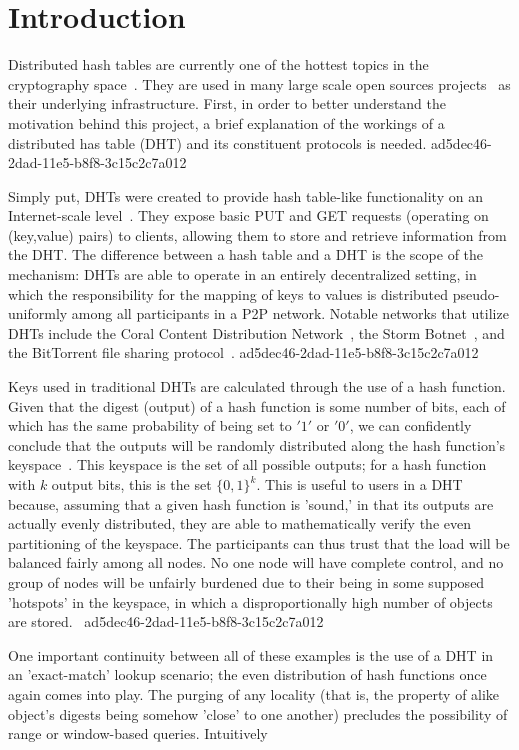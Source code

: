 \documentclass[12pt]{article}
\begin{document}
\section{Introduction}
\par Distributed hash tables are currently one of the hottest topics in the cryptography space~\cite{Stoica:2001dj,Rowstron:2001ea,Ratnasamy:2001wn}. They are used in many large scale open sources projects~\cite{Freitas:2013tb,Xu:2010vs,Perfitt:2010fh} as their underlying infrastructure. First, in order to better understand the motivation behind this project, a brief explanation of the workings of a distributed has table (DHT) and its constituent protocols is needed.
ad5dec46-2dad-11e5-b8f8-3c15c2c7a012
\par Simply put, DHTs were created to provide hash table-like functionality on an Internet-scale level~\cite{Ratnasamy:2001wn}. They expose basic PUT and GET requests (operating on (key,value) pairs) to clients, allowing them to store and retrieve information from the DHT. The difference between a hash table and a DHT is the scope of the mechanism: DHTs are able to operate in an entirely decentralized setting, in which the responsibility for the mapping of keys to values is distributed pseudo-uniformly among all participants in a P2P network. Notable networks that utilize DHTs include the Coral Content Distribution Network~\cite{Freedman:2004vb}, the Storm Botnet~\cite{Holz:2008uk}, and the BitTorrent file sharing protocol~\cite{Cohen:y1_8mBnw}.
ad5dec46-2dad-11e5-b8f8-3c15c2c7a012
\par Keys used in traditional DHTs are calculated through the use of a hash function. Given that the digest (output) of a hash function is some number of bits, each of which has the same probability of being set to $'1'$ or $'0'$, we can confidently conclude that the outputs will be randomly distributed along the hash function's keyspace~. This keyspace is the set of all possible outputs; for a hash function with $k$ output bits, this is the set $\{0,1\}^k$. This is useful to users in a DHT because, assuming that a given hash function is 'sound,' in that its outputs are actually evenly distributed, they are able to mathematically verify the even partitioning of the keyspace. The participants can thus trust that the load will be balanced fairly among all nodes. No one node will have complete control, and no group of nodes will be unfairly burdened due to their being in some supposed 'hotspots' in the keyspace, in which a disproportionally high number of objects are stored.~
ad5dec46-2dad-11e5-b8f8-3c15c2c7a012
\par One important continuity between all of these examples is the use of a DHT in an 'exact-match' lookup scenario; the even distribution of hash functions once again comes into play. The purging of any locality (that is, the property of alike object's digests being somehow 'close' to one another) precludes the possibility of range or window-based queries. Intuitively
\end{document}
